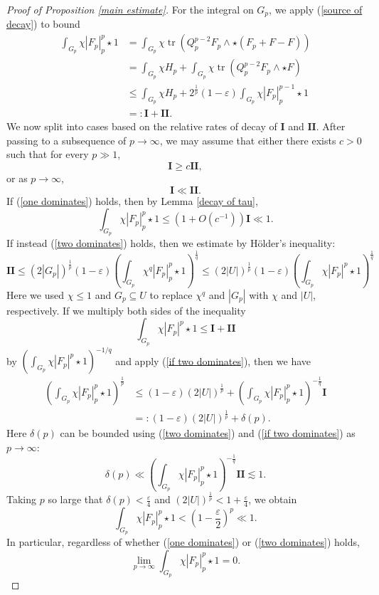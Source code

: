 \documentclass[reqno,11pt]{amsart}
\DeclareMathOperator{\tr}{tr}
\theoremstyle{definition}
\numberwithin{equation}{section}
\begin{document}
\begin{proof}[Proof of Proposition \ref{main estimate}]
For the integral on $G_p$, we apply (\ref{source of decay}) to bound
\begin{align*}
\int_{G_p} \chi |F_p|_p^p \star 1
&= \int_{G_p} \chi \tr(Q_p^{p - 2} F_p \wedge \star (F_p + F - F)) \\
&= \int_{G_p} \chi H_p + \int_{G_p} \chi \tr(Q_p^{p - 2} F_p \wedge \star F) \\
&\leq \int_{G_p} \chi H_p + 2^{\frac{1}{p}} (1 - \varepsilon) \int_{G_p} \chi |F_p|_p^{p - 1} \star 1 \\
&=: \mathbf I + \mathbf{II}.
\end{align*}
We now split into cases based on the relative rates of decay of $\mathbf I$ and $\mathbf{II}$.
After passing to a subsequence of $p \to \infty$, we may assume that either there exists $c > 0$ such that for every $p \gg 1$,
\begin{equation}\label{one dominates}
\mathbf I \geq c \mathbf{II},
\end{equation}
or as $p \to \infty$,
\begin{equation}\label{two dominates}
\mathbf I \ll \mathbf{II}.
\end{equation}
If (\ref{one dominates}) holds, then by Lemma \ref{decay of tau},
$$\int_{G_p} \chi |F_p|_p^p \star 1 \leq (1 + O(c^{-1})) \mathbf I \ll 1.$$
If instead (\ref{two dominates}) holds, then we estimate by H\"older's inequality:
\begin{equation}\label{if two dominates}
\mathbf{II}
\leq (2|G_p|)^{\frac{1}{p}} (1 - \varepsilon) \left(\int_{G_p} \chi^q |F_p|_p^p \star 1\right)^{\frac{1}{q}}
\leq (2|U|)^{\frac{1}{p}} (1 - \varepsilon) \left(\int_{G_p} \chi |F_p|^p \star 1\right)^{\frac{1}{q}}
\end{equation}
Here we used $\chi \leq 1$ and $G_p \subseteq U$ to replace $\chi^q$ and $|G_p|$ with $\chi$ and $|U|$, respectively.
If we multiply both sides of the inequality
$$\int_{G_p} \chi |F_p|^p \star 1 \leq \mathbf I + \mathbf{II}$$
by $(\int_{G_p} \chi |F_p|^p \star 1)^{-1/q}$ and apply (\ref{if two dominates}), then we have
\begin{align*}
\left(\int_{G_p} \chi |F_p|_p^p \star 1\right)^{\frac{1}{p}} 
&\leq (1 - \varepsilon) (2|U|)^{\frac{1}{p}} + \left(\int_{G_p} \chi |F_p|_p^p \star 1\right)^{-\frac{1}{q}} \mathbf I \\
&=: (1 - \varepsilon) (2|U|)^{\frac{1}{p}} + \delta(p).
\end{align*}
Here $\delta(p)$ can be bounded using (\ref{two dominates}) and (\ref{if two dominates}) as $p \to \infty$:
$$\delta(p) \ll \left(\int_{G_p} \chi |F_p|_p^p \star 1\right)^{-\frac{1}{q}} \mathbf{II} \lesssim 1.$$
Taking $p$ so large that $\delta(p) < \frac{\varepsilon}{4}$ and $(2|U|)^{\frac{1}{p}} < 1 + \frac{\varepsilon}{4}$, we obtain
$$\int_{G_p} \chi |F_p|_p^p \star 1 < \left(1 - \frac{\varepsilon}{2}\right)^p \ll 1.$$
In particular, regardless of whether (\ref{one dominates}) or (\ref{two dominates}) holds,
\begin{equation}\label{decay on positive}
\lim_{p \to \infty} \int_{G_p} \chi |F_p|_p^p \star 1 = 0.
\end{equation}


\end{proof}
\end{document}
